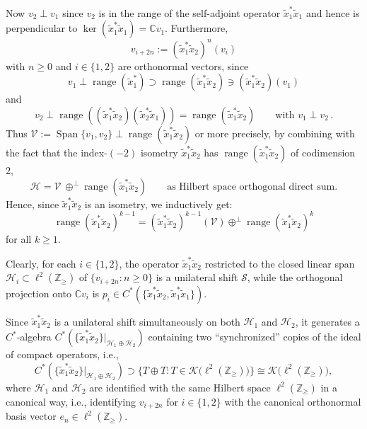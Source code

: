 Now $v_{2}\perp v_{1}$ since $v_{2}$ is in the range of the self-adjoint
operator $\tilde{x}_{1}^{\ast}\tilde{x}_{1}$ and hence is perpendicular to
$\ker( \tilde{x}_{1}^{\ast}\tilde{x}_{1}) =\mathbb{C}v_{1}$.
Furthermore,
\[
v_{i+2n}:=( \tilde{x}_{1}^{\ast}\tilde{x}_{2}) ^{n}(v_{i})
\]
with $n\geq0$ and $i\in\{ 1,2\} $ are orthonormal vectors, since
\[
v_{1}\perp\operatorname{range}( \tilde{x}_{1}^{\ast})
\supset\operatorname{range}( \tilde{x}_{1}^{\ast}\tilde{x}_{2})
\ni( \tilde{x}_{1}^{\ast}\tilde{x}_{2}) ( v_{1})
\]
and
\[
v_{2}\perp\operatorname{range}(( \tilde{x}_{1}^{\ast}\tilde
{x}_{2}) ( \tilde{x}_{2}^{\ast}\tilde{x}_{1}))
=\operatorname{range}( \tilde{x}_{1}^{\ast}\tilde{x}_{2})
\qquad \text{with\ \ }v_{1}\perp v_{2}\, .
\]
Thus $\mathcal{V}:=\operatorname{Span}\{ v_{1},v_{2}\}
\perp\operatorname{range}( \tilde{x}_{1}^{\ast}\tilde{x}_{2}) $
or more precisely, by combining with the fact that the index-$(
-2) $ isometry $\tilde{x}_{1}^{\ast}\tilde{x}_{2}$ has
$\operatorname{range}( \tilde{x}_{1}^{\ast}\tilde{x}_{2}) $ of
codimension $2$,
\[
\mathcal{H}=\mathcal{V~}\oplus^{\perp}\operatorname{range}( \tilde
{x}_{1}^{\ast}\tilde{x}_{2}) \qquad \text{as Hilbert space orthogonal
direct sum.}
\]
Hence, since $\tilde{x}_{1}^{\ast}\tilde{x}_{2}$ is an isometry, we inductively get:
\[
\operatorname{range}( \tilde{x}_{1}^{\ast}\tilde{x}_{2})
^{k-1}=( \tilde{x}_{1}^{\ast}\tilde{x}_{2}) ^{k-1}(
\mathcal{V}) \oplus^{\perp}\operatorname{range}( \tilde{x}_{1}^{\ast}\tilde{x}_{2}) ^{k}
\]
for all $k\geq1$.

Clearly, for each $i\in\{ 1,2\} $, the operator $\tilde{x}
_{1}^{\ast}\tilde{x}_{2}$ restricted to the closed linear span $\mathcal{H}
_{i}\subset\ell^{2}( \mathbb{Z}_{\geq}) $ of $\{
v_{i+2n}\colon n\geq0\} $ is a unilateral shift $\mathcal{S}$, while the
orthogonal projection onto $\mathbb{C}v_{i}$ is $p_{i}\in C^{\ast}(
\{ \tilde{x}_{1}^{\ast}\tilde{x}_{2},\tilde{x}_{1}^{\ast}\tilde{x}%
_{1}\})$.

Since $\tilde{x}_{1}^{\ast}\tilde{x}_{2}$ is a unilateral shift simultaneously
on both $\mathcal{H}_{1}$ and $\mathcal{H}_{2}$, it generates a $C^*$-algebra
$C^{\ast}(\{ \tilde{x}_{1}^{\ast}\tilde{x}_{2}\}
|_{\mathcal{H}_{1}\oplus\mathcal{H}_{2}}) $ containing two
``synchronized'' copies of the ideal of
compact operators, i.e.,
\[
C^{\ast}( \{ \tilde{x}_{1}^{\ast}\tilde{x}_{2}\}
|_{\mathcal{H}_{1}\oplus\mathcal{H}_{2}}) \supset\big\{ T\oplus
T\colon T\in\mathcal{K}\big( \ell^{2}( \mathbb{Z}_{\geq}) \big)
\big\} \cong\mathcal{K}\big( \ell^{2}( \mathbb{Z}_{\geq})\big),
\]
where $\mathcal{H}_{1}$ and $\mathcal{H}_{2}$ are identified with the same
Hilbert space $\ell^{2}( \mathbb{Z}_{\geq}) $ in a canonical way,
i.e., identifying $v_{i+2n}$ for $i\in\{ 1,2\} $ with the
canonical orthonormal basis vector $e_{n}\in\ell^{2}( \mathbb{Z}_{\geq
}) $.

